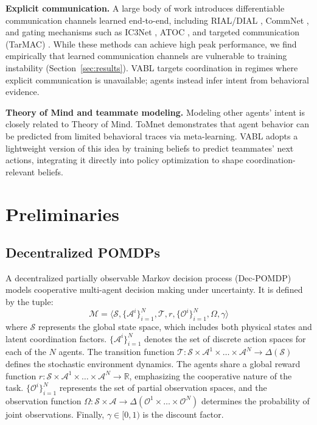 \documentclass{article}
\theoremstyle{plain}
\theoremstyle{definition}
\theoremstyle{remark}
\begin{document}
\textbf{Explicit communication.}
A large body of work introduces differentiable communication channels learned end-to-end, including RIAL/DIAL \cite{foerster2016learning}, CommNet \cite{sukhbaatar2016commnet}, and gating mechanisms such as IC3Net \cite{singh2018ic3net}, ATOC \cite{jiang2018atoc}, and targeted communication (TarMAC) \cite{das2019tarmac}. While these methods can achieve high peak performance, we find empirically that learned communication channels are vulnerable to training instability (Section~\ref{sec:results}). VABL targets coordination in regimes where explicit communication is unavailable; agents instead infer intent from behavioral evidence.

\textbf{Theory of Mind and teammate modeling.}
Modeling other agents' intent is closely related to Theory of Mind. ToMnet \cite{rabinowitz2018tomnet} demonstrates that agent behavior can be predicted from limited behavioral traces via meta-learning. VABL adopts a lightweight version of this idea by training beliefs to predict teammates' next actions, integrating it directly into policy optimization to shape coordination-relevant beliefs.

\section{Preliminaries}
\label{sec:prelim}

\subsection{Decentralized POMDPs}
A decentralized partially observable Markov decision process (Dec-POMDP) models cooperative multi-agent decision making under uncertainty. It is defined by the tuple:
\begin{equation}
\mathcal{M} = \langle \mathcal{S}, \{\mathcal{A}^i\}_{i=1}^N, \mathcal{T}, r, \{\mathcal{O}^i\}_{i=1}^N, \Omega, \gamma \rangle
\end{equation}
where $\mathcal{S}$ represents the global state space, which includes both physical states and latent coordination factors. $\{\mathcal{A}^i\}_{i=1}^N$ denotes the set of discrete action spaces for each of the $N$ agents. The transition function $\mathcal{T}: \mathcal{S} \times \mathcal{A}^1 \times \dots \times \mathcal{A}^N \rightarrow \Delta(\mathcal{S})$ defines the stochastic environment dynamics. The agents share a global reward function $r: \mathcal{S} \times \mathcal{A}^1 \times \dots \times \mathcal{A}^N \rightarrow \mathbb{R}$, emphasizing the cooperative nature of the task. $\{\mathcal{O}^i\}_{i=1}^N$ represents the set of partial observation spaces, and the observation function $\Omega: \mathcal{S} \times \mathcal{A} \rightarrow \Delta(\mathcal{O}^1 \times \dots \times \mathcal{O}^N)$ determines the probability of joint observations. Finally, $\gamma \in [0,1)$ is the discount factor.
\end{document}
